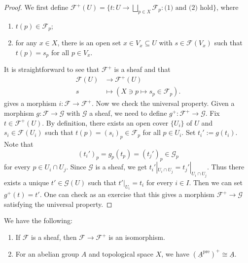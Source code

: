 \begin{proof}
  We first define
  $\mathcal{F}^+(U) = \{t : U \to \bigsqcup_{p \in X} \mathcal{F}_p : \text{(1) and (2) hold}\}$, where
  \begin{enumerate}
    \item $t(p) \in \mathcal{F}_p$;
    \item for any $x \in X$, there
      is an open set
      $x \in V_x \subseteq U$
      with $s \in \mathcal{F}(V_x)$
      such that $t(p) = s_p$ for
      all $p \in V_x$.
  \end{enumerate}
  It is straightforward to see that
  $\mathcal{F}^+$ is a sheaf and
  that
  \begin{align*}
    \mathcal{F}(U) &\longrightarrow \mathcal{F}^+(U) \\
    s
    &\longmapsto (X \ni p \mapsto s_p \in \mathcal{F}_p).
  \end{align*}
  gives a morphism
  $i : \mathcal{F} \to \mathcal{F}^+$.
  Now we check the universal property.
  Given a morphism
  $g : \mathcal{F} \to \mathcal{G}$
  with $\mathcal{G}$ a sheaf, we
  need to define $g^+ : \mathcal{F}^+ \to \mathcal{G}$.
  Fix $t \in \mathcal{F}^+(U)$.
  By definition, there exists an open
  cover  $\{U_i\}$ of $U$ and
  $s_i \in \mathcal{F}(U_i)$ such that
  $t(p) = (s_i)_p \in \mathcal{F}_p$
  for all $p \in U_i$.
  Set $t_i' := g(t_i)$. Note that
  \[
    (t_i')_p = g_p(t_p)
    = (t_j')_p
    \in \mathcal{G}_p
  \]
  for every $p \in U_i \cap U_j$.
  Since $\mathcal{G}$ is a sheaf, we
  get $t_i'|_{U_i \cap U_j} = t_j'|_{U_i \cap U_j}$.
  Thus there exists a unique
  $t' \in \mathcal{G}(U)$
  such that $t'|_{U_i} = t_i$
  for every $i \in I$. Then
  we can set $g^+(t) = t'$.
  One can check as an exercise
  that this gives a morphism
  $\mathcal{F}^+ \to \mathcal{G}$
  satisfying the universal property.
\end{proof}

\begin{example}
  We have the following:
  \begin{enumerate}
    \item If $\mathcal{F}$ is a
      sheaf, then $\mathcal{F} \to \mathcal{F}^+$
      is an isomorphism.
    \item For an abelian group
      $A$ and topological space
      $X$, we have
      $(\underline{A}^{\mathrm{pre}})^+ \cong \underline{A}$.
  \end{enumerate}
\end{example}

